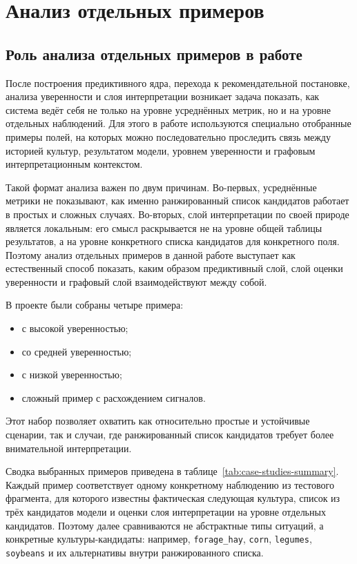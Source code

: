 \section{Анализ отдельных примеров}

\subsection{Роль анализа отдельных примеров в работе}

После построения предиктивного ядра, перехода к рекомендательной постановке, анализа уверенности и слоя интерпретации
возникает задача показать, как система ведёт себя не только на уровне усреднённых метрик, но и на уровне отдельных
наблюдений. Для этого в работе используются специально отобранные примеры полей, на которых можно последовательно
проследить связь между историей культур, результатом модели, уровнем уверенности и графовым интерпретационным
контекстом.

Такой формат анализа важен по двум причинам. Во-первых, усреднённые метрики не показывают, как именно ранжированный
список кандидатов работает в простых и сложных случаях. Во-вторых, слой интерпретации по своей природе является
локальным: его смысл раскрывается не на уровне общей таблицы результатов, а на уровне конкретного списка кандидатов для
конкретного поля. Поэтому анализ отдельных примеров в данной работе выступает как естественный способ показать, каким
образом предиктивный слой, слой оценки уверенности и графовый слой взаимодействуют между собой.

В проекте были собраны четыре примера:

\begin{itemize}
\tightlist
\item
  с высокой уверенностью;
\item
  со средней уверенностью;
\item
  с низкой уверенностью;
\item
  сложный пример с расхождением сигналов.
\end{itemize}

Этот набор позволяет охватить как относительно простые и устойчивые сценарии, так и случаи, где ранжированный список
кандидатов требует более внимательной интерпретации.

Сводка выбранных примеров приведена в таблице~\ref{tab:case-studies-summary}. Каждый пример соответствует одному
конкретному наблюдению из тестового фрагмента, для которого известны фактическая следующая культура, список из трёх
кандидатов модели и оценки слоя интерпретации на уровне отдельных кандидатов. Поэтому далее сравниваются не абстрактные
типы ситуаций, а конкретные культуры-кандидаты: например, \texttt{forage\_hay}, \texttt{corn}, \texttt{legumes},
\texttt{soybeans} и их альтернативы внутри ранжированного списка.

